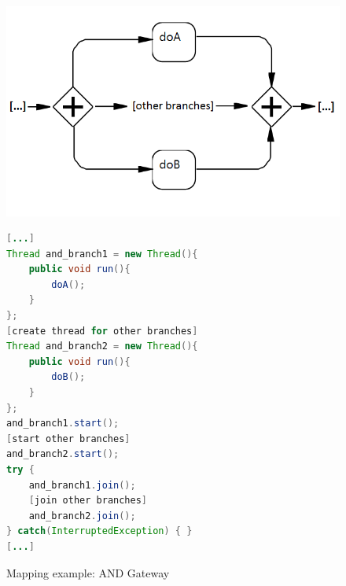 \begin{figure}[h]%
\begin{minipage}[c]{0.5\textwidth} 
\includegraphics[width=0.95\linewidth]{images/mapping/and-gateway.png}
\end{minipage}
\begin{minipage}[c]{0.5\textwidth} 
\begin{lstlisting}[language=Java]
[...]
Thread and_branch1 = new Thread(){
	public void run(){
		doA();
	}
};
[create thread for other branches]
Thread and_branch2 = new Thread(){
	public void run(){
		doB();
	}
};
and_branch1.start();
[start other branches]
and_branch2.start();
try {
	and_branch1.join();
	[join other branches]
	and_branch2.join();
} catch(InterruptedException) { }
[...]
\end{lstlisting}
\end{minipage}
\caption{Mapping example: AND Gateway}%
\label{fig:mapping_AND}%
\end{figure}



